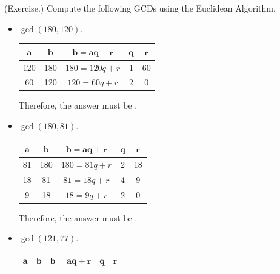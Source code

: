 \documentclass[letterpaper]{article}
\begin{document}
\begin{mdframed}
    (Exercise.) Compute the following GCDs using the Euclidean Algorithm.

    \begin{itemize}
        \item $\gcd(180, 120).$
        \begin{mdframed}
            \begin{center}
                \begin{tabular}{|c|c|c|c|c|}
                    \hline 
                    $\mathbf{a}$ & $\mathbf{b}$ & $\mathbf{b = aq + r}$ & $\mathbf{q}$ & $\mathbf{r}$ \\ 
                    \hline 
                    120 & 180 & $180 = 120q + r$ & 1   & 60 \\ 
                    60  & 120 & $120 = 60q + r$  & 2   & 0  \\ 
                    \hline 
                \end{tabular}
            \end{center}
            Therefore, the answer must be .
        \end{mdframed}
        \item $\gcd(180, 81).$
        \begin{mdframed}
            \begin{center}
                \begin{tabular}{|c|c|c|c|c|}
                    \hline 
                    $\mathbf{a}$ & $\mathbf{b}$ & $\mathbf{b = aq + r}$ & $\mathbf{q}$ & $\mathbf{r}$ \\ 
                    \hline 
                    81 & 180 & $180 = 81q + r$ & 2 & 18 \\ 
                    18 & 81 & $81 = 18q + r$ & 4 & 9 \\ 
                    9 & 18 & $18 = 9q + r$ & 2 & 0 \\ 
                    \hline 
                \end{tabular}
            \end{center}
            Therefore, the answer must be .
        \end{mdframed}
        \item $\gcd(121, 77).$
        \begin{mdframed}
            \begin{center}
                \begin{tabular}{|c|c|c|c|c|}
                    \hline 
                    $\mathbf{a}$ & $\mathbf{b}$ & $\mathbf{b = aq + r}$ & $\mathbf{q}$ & $\mathbf{r}$ \\ 

\end{tabular}
\end{center}
\end{mdframed}
\end{itemize}
\end{mdframed}
\end{document}
